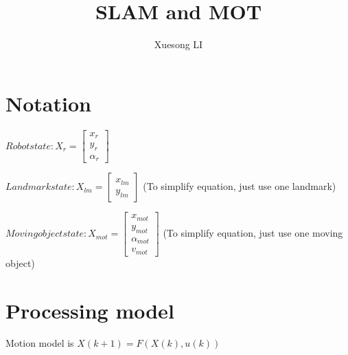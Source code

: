 \documentclass[11pt,a4paper]{article}
\begin{document}
\title{SLAM and MOT}
\author{Xuesong LI}
\date{}
\maketitle

\section{Notation}

$ Robot state: X_{r} = \begin{bmatrix} x_{r} \\ y_{r} \\ \alpha_{r} \end{bmatrix} $

\noindent$ Landmark state: X_{lm} =  \begin{bmatrix} x_{lm} \\ y_{lm} \end{bmatrix} $ (To simplify equation, just use one landmark)

\noindent$ Moving object state: X_{mot} = \begin{bmatrix} x_{mot} \\ y_{mot} \\ \alpha_{mot} \\ v_{mot} \end{bmatrix} $  (To simplify equation, just use one moving object)


\section{Processing model}
Motion model is   $X(k+1) = F(X(k), u(k))$
\\
\end{document}
